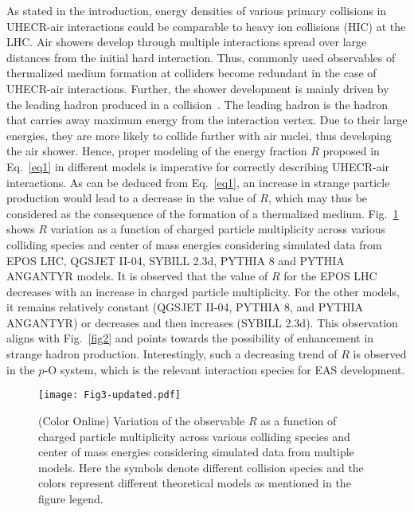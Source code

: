 \documentclass[aps,twocolumn,nofootinbib]{revtex4-1}
\begin{document}
As stated in the introduction, energy densities of various primary collisions in UHECR-air interactions could be comparable to heavy ion collisions (HIC) at the LHC. 
Air showers develop through multiple interactions spread over large distances from the initial hard interaction. Thus, commonly used observables of thermalized medium formation at colliders become redundant in the case of UHECR-air interactions.
Further, the shower development is mainly driven by the leading hadron produced in a collision~\cite{Anchordoqui:2016oxy}. The leading hadron is the hadron that carries away maximum energy from the interaction vertex. Due to their large energies, they are more likely to collide further with air nuclei, thus developing the air shower. Hence, proper modeling of the energy fraction $R$ proposed in Eq.~\ref{eq1} in different models is imperative for correctly describing UHECR-air interactions. As can be deduced from Eq.~\ref{eq1}, an increase in strange particle production would lead to a decrease in the value of $R$, which may thus be considered as the consequence of the formation of a thermalized medium. Fig.~\ref{fig3} shows $R$ variation as a function of charged particle multiplicity across various colliding species and center of mass energies considering simulated data from EPOS LHC, QGSJET II-04, SYBILL 2.3d, PYTHIA  8 and PYTHIA ANGANTYR models. It is observed that the value of $R$ for the EPOS LHC decreases with an increase in charged particle multiplicity. For the other models, it remains relatively constant (QGSJET II-04, PYTHIA 8, and PYTHIA ANGANTYR) or decreases and then increases (SYBILL 2.3d). This observation aligns with Fig.~\ref{fig2} and points towards the possibility of enhancement in strange hadron production. Interestingly, such a decreasing trend of $R$ is observed in the $p$-O system, which is the relevant interaction species for EAS development.\\

\begin{figure}[ht!]
\texttt{[image: Fig3-updated.pdf]}
\caption{(Color Online) Variation of the observable $R$ as a function of charged particle multiplicity across various colliding species and center of mass energies considering simulated data from multiple models. Here the symbols denote different collision species and the colors represent different theoretical models as mentioned in the figure legend.}
\label{fig3}
\end{figure}
\end{document}

